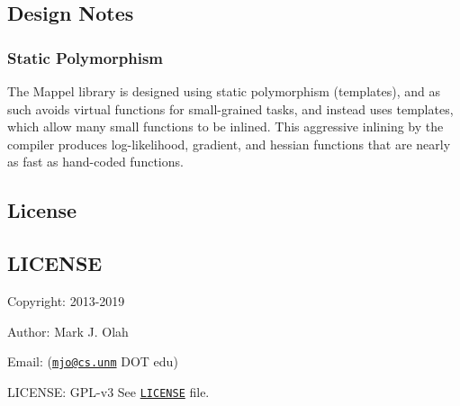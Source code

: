 \subsection*{Design Notes}

\subsubsection*{Static Polymorphism}

The Mappel library is designed using static polymorphism (templates), and as such avoids virtual functions for small-\/grained tasks, and instead uses templates, which allow many small functions to be inlined. This aggressive inlining by the compiler produces log-\/likelihood, gradient, and hessian functions that are nearly as fast as hand-\/coded functions.

\subsection*{License}

\subsection*{L\+I\+C\+E\+N\+SE}


\begin{DoxyItemize}
\item Copyright\+: 2013-\/2019
\item Author\+: Mark J. Olah
\item Email\+: (\href{mailto:mjo@cs.unm}{\tt mjo@cs.\+unm} D\+OT edu)
\item L\+I\+C\+E\+N\+SE\+: G\+P\+L-\/v3 See \href{https://github.com/markjolah/MexIFace/blob/master/LICENSE}{\tt L\+I\+C\+E\+N\+SE} file. 
\end{DoxyItemize}